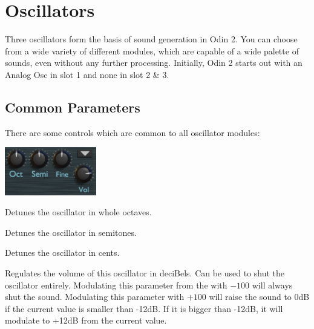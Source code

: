 \chapter{Oscillators}
\label{oscillators}
Three oscillators form the basis of sound generation in Odin 2. You can choose from a wide variety of different modules, which are capable of a wide palette of sounds, even without any further processing. Initially, Odin 2 starts out with an Analog Osc in slot 1 and none in slot 2 \& 3. 
\vspace{5mm}


\section{Common Parameters}
There are some controls which are common to all oscillator modules:

\begin{center}
    \includegraphics[width=0.3\textwidth]{graphics/osc_common.png}
\end{center}

{Detunes the oscillator in whole octaves.}

{Detunes the oscillator in semitones.}

{Detunes the oscillator in cents.}

{Regulates the volume of this oscillator in deciBels. Can be used to shut the oscillator entirely. Modulating this parameter from the \modmatrix  with $-100$ will always shut the sound. Modulating this parameter with $+100$ will raise the sound to 0dB if the current value is smaller than -12dB. If it is bigger than -12dB, it will modulate to +12dB from the current value.}


